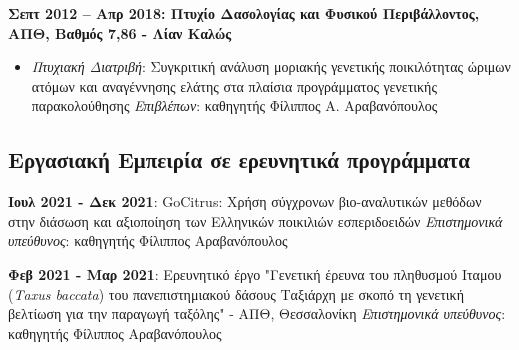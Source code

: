 \documentclass[12pt,]{scrartcl}
\begin{document}
\vspace{2mm}

\textbf{Σεπτ 2012 -- Απρ 2018: Πτυχίο Δασολογίας και Φυσικού Περιβάλλοντος, ΑΠΘ, Βαθμός 7,86 - Λίαν Καλώς}
\begin{itemize}
\setlength\itemsep{-0.5em}
\item \textit{Πτυχιακή Διατριβή}: Συγκριτική ανάλυση μοριακής γενετικής ποικιλότητας
ώριμων ατόμων και αναγέννησης ελάτης στα πλαίσια
προγράμματος γενετικής παρακολούθησης
\vspace{1mm}
\newline
\textit{Επιβλέπων}: καθηγητής Φίλιππος Α. Αραβανόπουλος
\end{itemize}

\vspace{-3mm}

\subsection{Εργασιακή Εμπειρία σε ερευνητικά προγράμματα}\label{Εμπειρία}
\vspace{-3mm}


\textbf{Ιουλ 2021 - Δεκ 2021}: GoCitrus: Χρήση σύγχρονων βιο-αναλυτικών μεθόδων στην διάσωση και αξιοποίηση των Ελληνικών ποικιλιών εσπεριδοειδών
\vspace{2mm}
\newline
\textit{Επιστημονικά υπεύθυνος}: καθηγητής Φίλιππος Αραβανόπουλος

\textbf{Φεβ 2021 - Μαρ 2021}: Ερευνητικό έργο "Γενετική έρευνα του πληθυσμού Ιταμου (\textit{Τaxus baccata}) του πανεπιστημιακού δάσους Ταξιάρχη με σκοπό τη γενετική
βελτίωση για την παραγωγή ταξόλης" - ΑΠΘ, Θεσσαλονίκη
\vspace{2mm}
\newline
\textit{Επιστημονικά υπεύθυνος}: καθηγητής Φίλιππος Αραβανόπουλος
\end{document}
